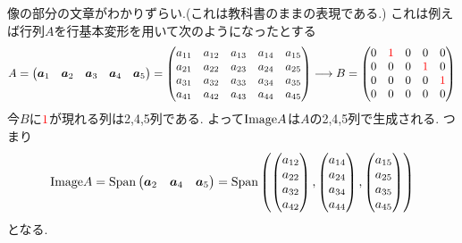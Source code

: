 \documentclass[dvipdfmx,a4paper,11pt]{article}
\theoremstyle{definition}
\newcommand{\xr}[1]{\textcolor{red}{#1}}
\begin{document}
像の部分の文章がわかりずらい.(これは教科書のままの表現である.)
これは例えば行列$A$を行基本変形を用いて次のようになったとする
$$
A=
    \begin{pmatrix}
    \bm{a}_1&\bm{a}_2&\bm{a}_3&\bm{a}_4&\bm{a}_5
    \end{pmatrix}
   =
\begin{pmatrix}
a_{11}& a_{12} &a_{13}& a_{14} & a_{15}  \\
a_{21}& a_{22} & a_{23}& a_{24} & a_{25}   \\
a_{31}& a_{32} &a_{33}& a_{34} & a_{35}  \\
a_{41}& a_{42} &a_{43}& a_{44} & a_{45}  \\
\end{pmatrix}
\longrightarrow 
B=
\begin{pmatrix}
0& \xr{1}& 0& 0 & 0   \\
0& 0 &0&\xr{1}&0 \\
0& 0 &0& 0&\xr{1}  \\
0& 0&0& 0& 0 \\
\end{pmatrix}
$$
今$B$に$\xr{1}$が現れる列は2,4,5列である.
よって${\rm Image}A$は$A$の2,4,5列で生成される. 
つまり
$$
{\rm Image}A
={\rm Span}
    \begin{pmatrix}
    \bm{a}_2&\bm{a}_4&\bm{a}_5
    \end{pmatrix}
={\rm Span}\left(
\begin{pmatrix}
a_{12}\\a_{22}\\a_{32}\\a_{42}
\end{pmatrix},
\begin{pmatrix}
a_{14}\\a_{24}\\a_{34}\\a_{44}
\end{pmatrix},
\begin{pmatrix}
a_{15}\\a_{25}\\a_{35}\\a_{45}
\end{pmatrix}
\right)
$$
となる. 
\end{document}
